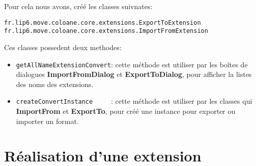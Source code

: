 \documentclass{article}
\begin{document}
Pour cela nous avons, créé les classes suivnates:
\begin{verbatim}
fr.lip6.move.coloane.core.extensions.ExportToExtension
fr.lip6.move.coloane.core.extensions.ImportFromExtension
\end{verbatim}
Ces classes possedent deux methodes:
\begin{itemize}
  \item \verb?getAllNameExtensionConvert?: cette méthode est utiliser par les boîtes de dialogues \textbf{ImportFromDialog} et \textbf{ExportToDialog}, pour 
afficher la listes des noms des extensions.
  \item \verb?createConvertInstance     ?: cette méthode est utiliser 
par les classes qui \textbf{ImportFrom} et \textbf{ExportTo}, pour créé 
une instance pour exporter ou importer un format.
\end{itemize}

\newpage

\section{Réalisation d'une extension}
\end{document}
